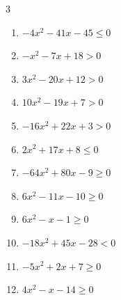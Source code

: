 \begin{multicols}{3}
\begin{enumerate}

  \item $-4x^{2}-41x-45\leq 0$


  \item $-x^{2}-7x+18>0$

        \phantom{$\displaystyle -9 < x < 2$}

  \item $3x^{2}-20x+12>0$


  \item $10x^{2}-19x+7>0$


  \item $-16x^{2}+22x+3>0$


  \item $2x^{2}+17x+8\leq 0$


  \item $-64x^{2}+80x-9\geq 0$


  \item $6x^{2}-11x-10\geq 0$


  \item $6x^{2}-x-1\geq 0$


\columnbreak %

  \item $-18x^{2}+45x-28<0$


  \item $-5x^{2}+2x+7\geq 0$


  \item $4x^{2}-x-14\geq 0$


\end{enumerate}
\end{multicols}
